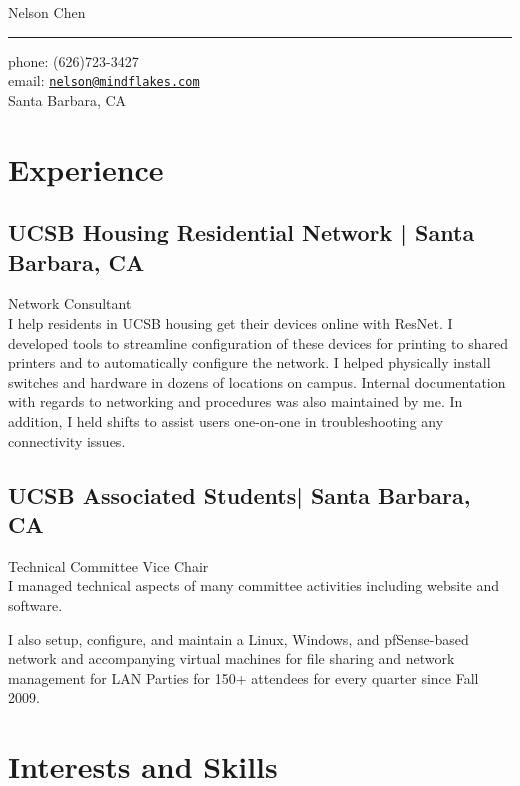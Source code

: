 \documentclass[10pt,a4paper]{article}
\makeatletter
\def\myname{Nelson Chen}
\def\myemail{nelson@mindflakes.com}
\def\mycellphone{(626)723-3427}
\def\myaddress{Santa Barbara, CA}
\newcommand{\years}[1]{\marginnote{#1}}
\makeatother
\begin{document}
{\LARGE \myname}\\
\hrule
\vspace{0.2in}
{\large phone: \mycellphone}\\[.05cm]
{\large email: \href{mailto:\myemail}{\texttt{\myemail}}}\\[.05cm]
\myaddress
\vspace{0.5in}

\section*{Experience}

\subsection*{UCSB Housing Residential Network | {\footnotesize{Santa Barbara, CA}}}

\years{2009- \ldots} Network Consultant\\
I help residents in UCSB housing get their devices online with ResNet.
I developed tools to streamline configuration of these devices for printing to
shared printers and to automatically configure the network. I helped physically
install switches and hardware in dozens of locations on campus. Internal
documentation with regards to networking and procedures was also maintained by
me. In addition, I held shifts to assist users one-on-one in troubleshooting
any connectivity issues.


\subsection*{UCSB Associated Students| {\footnotesize{Santa Barbara, CA}}}

\years{2009-2012} Technical Committee Vice Chair \\
I managed technical aspects of many committee activities including website and
software.

I also setup, configure, and maintain a Linux, Windows, and pfSense-based
network and accompanying virtual machines for file sharing and network
management for LAN Parties for 150+ attendees for every quarter since Fall 2009.

\section*{Interests and Skills}
\end{document}
